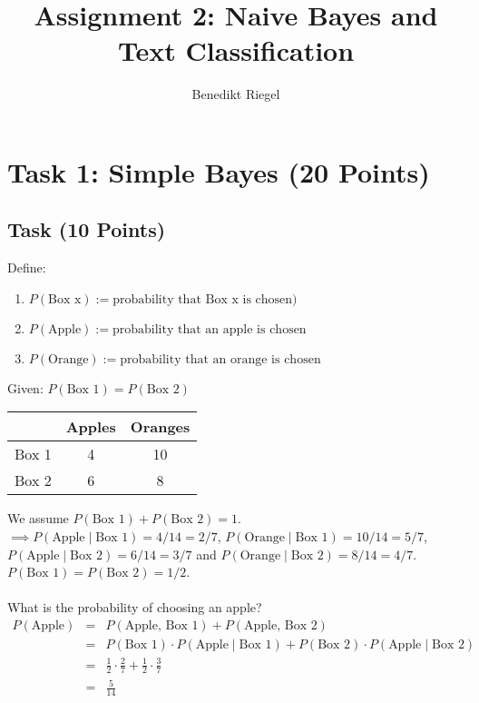 \documentclass{article}
\title{Assignment 2: Naive Bayes and Text Classification}
\author{Benedikt Riegel}
\begin{document}
	\maketitle
	\section{Task 1: Simple Bayes (20 Points)}
	\subsection{Task (10 Points)}
	Define:
	\begin{enumerate}[label=-]
		\item $P(\text{Box x}) := \text{probability that Box x is chosen})$
		\item $P(\text{Apple}) := \text{probability that an apple is chosen}$
		\item $P(\text{Orange}) := \text{probability that an orange is chosen}$
	\end{enumerate}
	Given: $P(\text{Box 1}) = P(\text{Box 2})$
	\begin{center}
		\begin{tabular}{ |c|c|c| } 
			\hline
			& Apples & Oranges \\ 
			\hline
			Box 1 & 4 & 10 \\ 
			\hline
			Box 2 & 6 & 8 \\ 
			\hline
		\end{tabular}
	\end{center}
	We assume $P(\text{Box 1}) + P(\text{Box 2}) = 1$.\\
	$\implies P(\text{Apple}\mid\text{Box 1}) = 4/14 = 2/7$, $P(\text{Orange}\mid\text{Box 1}) = 10/14 = 5/7$,\\
	$P(\text{Apple}\mid\text{Box 2}) = 6/14 = 3/7$ and $P(\text{Orange}\mid\text{Box 2}) = 8/14 = 4/7$.\\
	$P(\text{Box 1}) = P(\text{Box 2}) = 1/2$.\\\\
	What is the probability of choosing an apple?\\
	\begin{eqnarray*}
		P(\text{Apple}) &=& P(\text{Apple, Box 1}) + P(\text{Apple, Box 2})\\
		&=& P(\text{Box 1}) \cdot P(\text{Apple}\mid\text{Box 1}) + P(\text{Box 2}) \cdot P(\text{Apple}\mid\text{Box 2})\\
		&=& \frac{1}{2} \cdot \frac{2}{7} + \frac{1}{2} \cdot \frac{3}{7}\\
		&=& \frac{5}{14}
	\end{eqnarray*}
\end{document}
